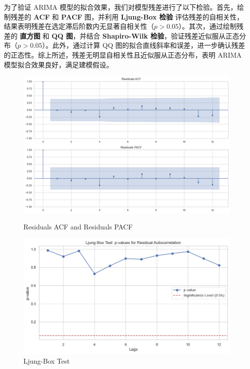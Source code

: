 \documentclass[UTF8]{ctexart}
\begin{document}
为了验证 ARIMA 模型的拟合效果，我们对模型残差进行了以下检验。首先，绘制残差的 \textbf{ACF} 和 \textbf{PACF} 图，并利用 \textbf{Ljung-Box 检验} 评估残差的自相关性，结果表明残差在选定滞后阶数内无显著自相关性（$p > 0.05$）。其次，通过绘制残差的 \textbf{直方图} 和 \textbf{QQ 图}，并结合 \textbf{Shapiro-Wilk 检验}，验证残差近似服从正态分布（$p > 0.05$）。此外，通过计算 QQ 图的拟合直线斜率和误差，进一步确认残差的正态性。综上所述，残差无明显自相关性且近似服从正态分布，表明 ARIMA 模型拟合效果良好，满足建模假设。

\begin{figure}[ht]
  \centering
  \begin{minipage}[b]{0.42\textwidth} %
    \includegraphics[width=\textwidth]{5} %
    \caption{Residuals ACF and Residuals PACF}
    \label{fig:image-a}
  \end{minipage}
  
  \begin{minipage}[b]{0.42\textwidth} %
    \includegraphics[width=\textwidth]{8} %
    \caption{Ljung-Box Test}
    \label{fig:image-a}
  \end{minipage}
  

\end{figure}
\end{document}
